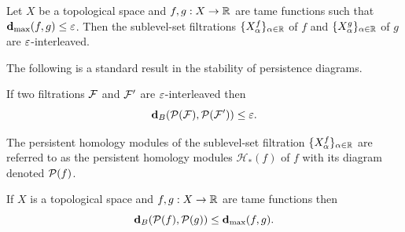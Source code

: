 \begin{lemma}\label{lem:interleave}
    Let $X$ be a topological space and $f,g: X\to\mathbb{R}$ are tame functions such that $\mathbf{d}_{\mathrm{max}}(f, g)\leq\varepsilon$.
    Then the sublevel-set filtrations $\{X_\alpha^f\}_{\alpha\in\mathbb{R}}$ of $f$ and $\{X_\alpha^g\}_{\alpha\in\mathbb{R}}$ of $g$ are $\varepsilon$-interleaved.
\end{lemma}

The following is a standard result in the stability of persistence diagrams.

\begin{lemma}\label{lem:stability}
    If two filtrations $\mathcal{F}$ and $\mathcal{F}'$ are $\varepsilon$-interleaved then
    \[ \mathbf{d}_B(\mathcal{P}(\mathcal{F}), \mathcal{P}(\mathcal{F}'))\leq\varepsilon. \]
\end{lemma}

The persistent homology modules of the sublevel-set filtration $\{X^f_\alpha\}_{\alpha\in\mathbb{R}}$ are referred to as the persistent homology modules $\mathcal{H}_*(f)$ of $f$ with its diagram denoted $\mathcal{P}(f)$.

\begin{corollary}\label{cor:stability}
    If $X$ is a topological space and $f,g:X\to\mathbb{R}$ are tame functions then
    \[ \mathbf{d}_B(\mathcal{P}(f), \mathcal{P}(g))\leq\mathbf{d}_{\mathrm{max}}(f, g). \]
\end{corollary}
